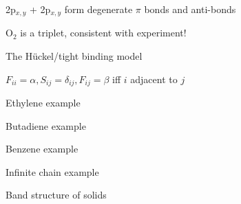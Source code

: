\message{ !name(Outline.tex)}\documentclass[11pt]{article}
\begin{document}
\begin{outline}
\begin{outline}
\begin{outline}
\begin{outline}
     \item 2p$_{x,y}$ + 2p$_{x,y}$ form degenerate $\pi$ bonds and anti-bonds
     \item O$_2$ is a triplet, consistent with experiment!
     \end{outline}
   \end{outline}
 \item The H\"uckel/tight binding model
    \begin{outline}
   \item $F_{ii}=\alpha, S_{ij}=\delta_{ij}, F_{ij}=\beta$ iff $i$ adjacent
     to $j$
   \item Ethylene example
   \item Butadiene example
   \item Benzene example
   \item Infinite chain example      
    \end{outline}
  \item Band structure of solids
  \end{outline}


\end{outline}
\end{document}
